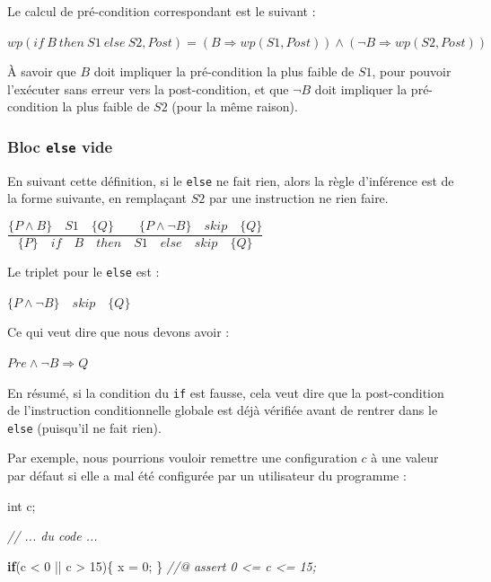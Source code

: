 \documentclass[12pt,francais,]{scrbook}
\newenvironment{Shaded}{}{}
\newcommand{\KeywordTok}[1]{\textcolor[rgb]{0.00,0.44,0.13}{\textbf{{#1}}}}
\newcommand{\DataTypeTok}[1]{\textcolor[rgb]{0.56,0.13,0.00}{{#1}}}
\newcommand{\DecValTok}[1]{\textcolor[rgb]{0.25,0.63,0.44}{{#1}}}
\newcommand{\CommentTok}[1]{\textcolor[rgb]{0.38,0.63,0.69}{\textit{{#1}}}}
\newcommand{\NormalTok}[1]{{#1}}
\begin{document}
Le calcul de pré-condition correspondant est le suivant :

\begin{center}
\(wp(if\ B\ then\ S1\ else\ S2 , Post) = (B \Rightarrow wp(S1, Post)) \wedge (\neg B \Rightarrow wp(S2, Post))\)
\end{center}

À savoir que \(B\) doit impliquer la pré-condition la plus faible de
\(S1\), pour pouvoir l'exécuter sans erreur vers la post-condition, et
que \(\neg B\) doit impliquer la pré-condition la plus faible de \(S2\)
(pour la même raison).

\subsubsection{\texorpdfstring{Bloc \texttt{else}
vide}{Bloc else vide}}\label{bloc-else-vide}

En suivant cette définition, si le \texttt{else} ne fait rien, alors la
règle d'inférence est de la forme suivante, en remplaçant \(S2\) par une
instruction \og{}ne rien faire\fg{}.

\begin{center}
\(\dfrac{\{P \wedge B\}\quad S1\quad \{Q\} \quad \quad \{P \wedge \neg B\}\quad skip\quad \{Q\}}{\{P\}\quad if\quad B\quad then\quad S1\quad else\quad skip \quad \{Q\}}\)
\end{center}

Le triplet pour le \texttt{else} est :

\begin{center} \(\{P \wedge \neg B\}\quad skip\quad \{Q\}\)
\end{center}

Ce qui veut dire que nous devons avoir :

\begin{center} \(Pre \wedge \neg B \Rightarrow Q\) \end{center}

En résumé, si la condition du \texttt{if} est fausse, cela veut dire que
la post-condition de l'instruction conditionnelle globale est déjà
vérifiée avant de rentrer dans le \texttt{else} (puisqu'il ne fait
rien).

Par exemple, nous pourrions vouloir remettre une configuration \(c\) à
une valeur par défaut si elle a mal été configurée par un utilisateur du
programme :

\begin{footnotesize}\begin{Shaded}
\begin{Highlighting}[]
\DataTypeTok{int} \NormalTok{c;}

\CommentTok{// ... du code ...}

\KeywordTok{if}\NormalTok{(c < }\DecValTok{0} \NormalTok{|| c > }\DecValTok{15}\NormalTok{)\{}
  \NormalTok{x = }\DecValTok{0}\NormalTok{;}
\NormalTok{\}}
\CommentTok{//@ assert 0 <= c <= 15;}
\end{Highlighting}
\end{Shaded}\end{footnotesize}
\end{document}
